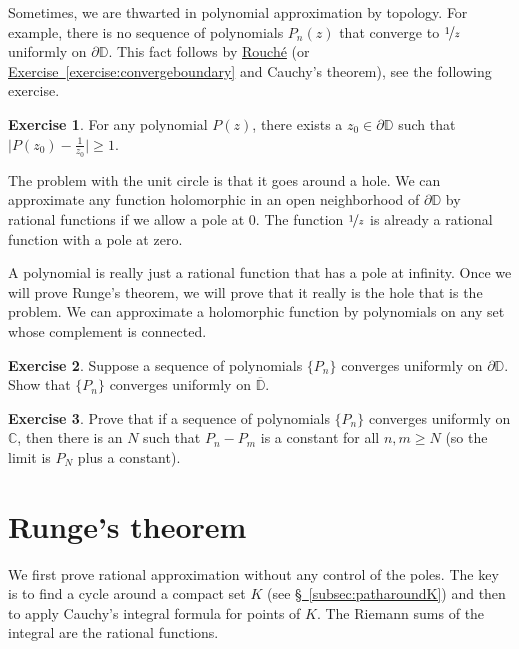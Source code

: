 \documentclass[12pt,openany]{book}
\newcommand{\babs}[1]{\bigl\lvert {#1} \bigr\rvert}
\newcommand{\C}{{\mathbb{C}}}
\newcommand{\D}{{\mathbb{D}}}
\theoremstyle{plain}
\theoremstyle{remark}
\theoremstyle{definition}
\newenvironment{exbox}{%
    \def\FrameCommand{\vrule width 1pt \relax\hspace{10pt}}%
    \MakeFramed{\advance\hsize-\width\FrameRestore}%
}{%
    \endMakeFramed
}
\theoremstyle{exercise}
\newtheorem{exercise}{Exercise}[section]
\theoremstyle{example}
\newcommand{\subsectionref}[1]{\hyperref[#1]{\S~\ref*{#1}}}
\newcommand{\exerciseref}[1]{\hyperref[#1]{Exercise~\ref*{#1}}}
\begin{document}
Sometimes, we are thwarted in polynomial approximation by topology.
For example, there is no sequence of
polynomials $P_n(z)$ that converge to $\nicefrac{1}{z}$ uniformly on $\partial
\D$.  This fact follows by \hyperref[thm:rouche]{Rouch\'e} (or
\exerciseref{exercise:convergeboundary} and Cauchy's theorem), see the
following exercise.

\begin{exbox}
\begin{exercise}
For any polynomial $P(z)$, there exists a $z_0 \in \partial \D$ such that
$\babs{P(z_0)-\frac{1}{z_0}} \geq 1$.
\end{exercise}
\end{exbox}

The problem with the unit circle is that it goes around a hole.  We can approximate
any function holomorphic in an open neighborhood of $\partial \D$ by rational
functions if we allow a pole at $0$.  The function $\nicefrac{1}{z}$ is already
a rational function with a pole at zero.

A polynomial is really just a rational function that has a pole at infinity.
Once we will prove Runge's theorem, we will prove that it really is the hole
that is the problem.  We can approximate a holomorphic function
by polynomials on any set whose complement is connected.

\begin{exbox}
\begin{exercise}
Suppose a sequence of polynomials $\{ P_n \}$ converges uniformly on
$\partial \D$.  Show that $\{ P_n \}$ converges uniformly on
$\overline{\D}$.
\end{exercise}

\begin{exercise}
Prove that if a sequence of polynomials $\{ P_n \}$ converges uniformly on
$\C$,
then there is an $N$ such that $P_n - P_m$ is a constant for all $n,m \geq N$
(so the limit is $P_N$ plus a constant).
\end{exercise}
\end{exbox}



\section{Runge's theorem}
\label{sec:runge}

We first prove rational approximation without any control of the poles.
The key is to find a cycle around a compact set $K$
(see \subsectionref{subsec:patharoundK})
and then to apply Cauchy's integral formula for points of $K$.
The Riemann sums of the
integral are the rational functions.
\end{document}
